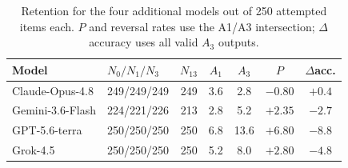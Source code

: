 \begin{table}[htbp]
\caption{Retention for the four additional models out of 250 attempted items each. $P$ and reversal rates use the A1/A3 intersection; $\Delta$accuracy uses all valid $A_3$ outputs.}
\label{tab:current_counts}
\centering
\small
\setlength{\tabcolsep}{3.5pt}
\begin{tabular}{llrcccc}
\toprule
Model & $N_0/N_1/N_3$ & $N_{13}$ & $A_1$ & $A_3$ & $P$ & $\Delta$acc. \\
\midrule
Claude-Opus-4.8 & 249/249/249 & 249 & 3.6 & 2.8 & $-0.80$ & $+0.4$ \\
Gemini-3.6-Flash & 224/221/226 & 213 & 2.8 & 5.2 & $+2.35$ & $-2.7$ \\
GPT-5.6-terra & 250/250/250 & 250 & 6.8 & 13.6 & $+6.80$ & $-8.8$ \\
Grok-4.5 & 250/250/250 & 250 & 5.2 & 8.0 & $+2.80$ & $-4.8$ \\
\bottomrule
\end{tabular}
\end{table}
